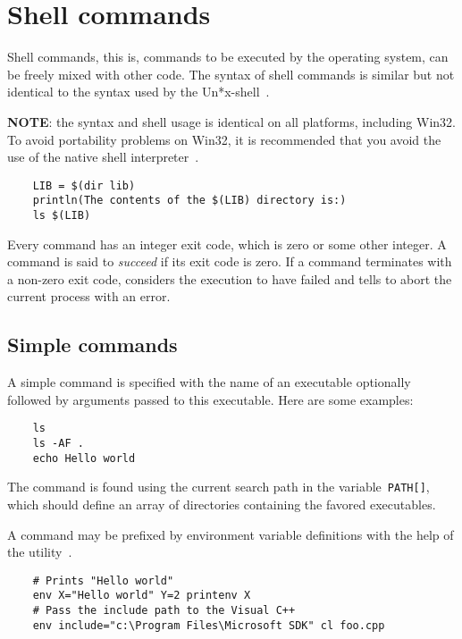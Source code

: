 %
\chapter{Shell commands}
\label{chapter:shell}

Shell commands, this is, commands to be executed by the operating system, can be freely mixed with
other code.  The syntax of shell commands is similar but not identical to the syntax used by the
Un*x-shell~.

\textbf{NOTE}: the syntax and shell usage is identical on all platforms, including Win32.  To avoid
portability problems on Win32, it is recommended that you avoid the use of the native shell
interpreter~.

\begin{verbatim}
    LIB = $(dir lib)
    println(The contents of the $(LIB) directory is:)
    ls $(LIB)
\end{verbatim}

Every command has an integer exit code, which is zero or some other integer.  A command is said to
\emph{succeed} if its exit code is zero.  If a command terminates with a non-zero exit code,
 considers the execution to have failed and tells \OMake{} to abort the current process
with an error.

\section{Simple commands}

A simple command is specified with the name of an executable optionally followed by arguments passed
to this executable.  Here are some examples:

\begin{verbatim}
    ls
    ls -AF .
    echo Hello world
\end{verbatim}

The command is found using the current search path in the variable~\verb+PATH[]+, which should
define an array of directories containing the favored executables.

A command may be prefixed by environment variable definitions with the help of the
utility~.

\begin{verbatim}
    # Prints "Hello world"
    env X="Hello world" Y=2 printenv X
    # Pass the include path to the Visual C++
    env include="c:\Program Files\Microsoft SDK" cl foo.cpp
\end{verbatim}


